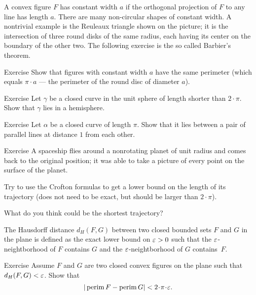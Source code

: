 A convex figure $F$ has constant width $a$ if the orthogonal projection of $F$ to any line has length $a$.
There are many non-circular shapes of constant width. 
A nontrivial example is the Reuleaux triangle shown on the picture;
it is the intersection of three round disks of the same radius, each having its center on the boundary of the other two.
The following exercise is the so called Barbier's theorem.

\begin{thm}{Exercise} 
Show that figures with constant width $a$ have the same perimeter (which equals $\pi\cdot a$ --- the perimeter of the round disc of diameter $a$).
\end{thm}

\begin{thm}{Exercise}\label{ex:2pi-sphere}
Let $\gamma$ be a closed curve in the unit sphere of length shorter than $2\cdot\pi$.
Show that $\gamma$ lies in a hemisphere.
\end{thm}

\begin{thm}{Exercise} 
Let $\alpha$ be a closed curve of length $\pi$.
Show that it lies between a pair of parallel lines at distance $1$ from each other.
\end{thm}

\begin{thm}{Exercise}
A spaceship flies around a nonrotating planet of unit radius and comes back to the original position;
it was able to take a picture of every point on the surface of the planet.

Try to use the Crofton formulas to get a lower bound on the length of its trajectory (does not need to be exact, but should be larger than $2\cdot\pi$).

What do you think could be the shortest trajectory?
\end{thm}

The Hausdorff distance $d_H(F,G)$ between two closed bounded sets $F$ and $G$ in the plane is defined as the exact lower bound on $\varepsilon>0$ such that the $\varepsilon$-neightborhood of $F$ contains $G$ and the $\varepsilon$-neightborhood of $G$ contains~$F$.

\begin{thm}{Exercise}\label{ex:perim-hausdorff}
Assume $F$ and $G$ are two closed convex figures on the plane such that $d_H(F,G)<\varepsilon$.
Show that 
\[|\perim F-\perim G|<2\cdot\pi\cdot\eps.\]

\end{thm}

